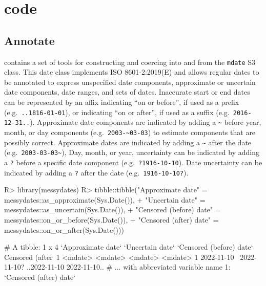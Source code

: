 \documentclass[
]{jss}
\begin{document}
\section[R code]{ code}\label{r-code}

\hypertarget{annotate}{%
\subsection{Annotate}\label{annotate}}

 contains a set of tools for constructing and coercing
into and from the \texttt{mdate} S3 class. This date class implements
ISO 8601-2:2019(E) and allows regular dates to be annotated to express
unspecified date components, approximate or uncertain date components,
date ranges, and sets of dates. Inaccurate start or end dates can be
represented by an affix indicating ``on or before'', if used as a prefix
(e.g.~\texttt{..1816-01-01}), or indicating ``on or after'', if used as
a suffix (e.g.~\texttt{2016-12-31..}). Approximate date components are
indicated by adding a \texttt{\textasciitilde{}} before year, month, or
day components (e.g.~\texttt{2003-\textasciitilde{}03-03}) to estimate
components that are possibly correct. Approximate dates are indicated by
adding a \texttt{\textasciitilde{}} after the date
(e.g.~\texttt{2003-03-03\textasciitilde{}}), Day, month, or year,
uncertainty can be indicated by adding a \texttt{?} before a specific
date component (e.g.~\texttt{?1916-10-10}). Date uncertainty can be
indicated by adding a \texttt{?} after the date
(e.g.~\texttt{1916-10-10?}).

\begin{CodeChunk}
\begin{CodeInput}
R> library(messydates)
R> tibble::tibble("Approximate date" = messydates::as_approximate(Sys.Date()), 
+                "Uncertain date" = messydates::as_uncertain(Sys.Date()),
+                "Censored (before) date" = messydates::on_or_before(Sys.Date()),
+                "Censored (after) date" = messydates::on_or_after(Sys.Date()))
\end{CodeInput}
\begin{CodeOutput}
# A tibble: 1 x 4
  `Approximate date` `Uncertain date` `Censored (before) date` Censored (after~1
  <mdate>            <mdate>          <mdate>                  <mdate>          
1 2022-11-10~        2022-11-10?      ..2022-11-10             2022-11-10..     
# ... with abbreviated variable name 1: `Censored (after) date`
\end{CodeOutput}
\end{CodeChunk}
\end{document}
